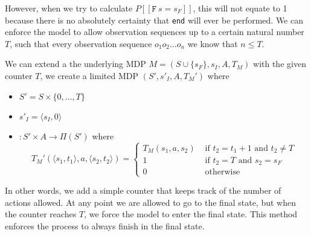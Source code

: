 However, when we try to calculate $P[[ \texttt{F}\:s=s_F]]$, this will not equate to 1 because there is no absolutely certainty that \texttt{end} will ever be performed. We can enforce the model to allow observation sequences up to a certain natural number $T$, such that every observation sequence $o_1 o_2 \dots o_n$ we know that $n\leq T$. 

\begin{definition}
We can extend a the underlying MDP $M=(S\cup\{s_F\}, s_I, A, T_M)$ with the given counter $T$, we create a limited MDP $(S',s'_I,A,T_M')$ where
\begin{itemize}
	\item $S' = S\times \{0,\dots, T\}$
	\item $s'_I = \langle s_I,0\rangle$
	\item $:S'\times A \to \Pi(S')$ where 
	\[T_M'(\langle s_1,t_1\rangle,a,\langle s_2,t_2\rangle) = \begin{cases}
	T_M(s_1,a,s_2) & \text{ if } t_2 = t_1 + 1 \text{ and } t_2 \neq T\\
	1 & \text{ if } t_2 = T \text{ and } s_2 = s_F \\
	0 & \text{ otherwise }
	\end{cases}\]
\end{itemize}
\end{definition}

In other words, we add a simple counter that keeps track of the number of actions allowed. At any point we are allowed to go to the final state, but when the counter reaches $T$, we force the model to enter the final state. This method enforces the process to always finish in the final state. 